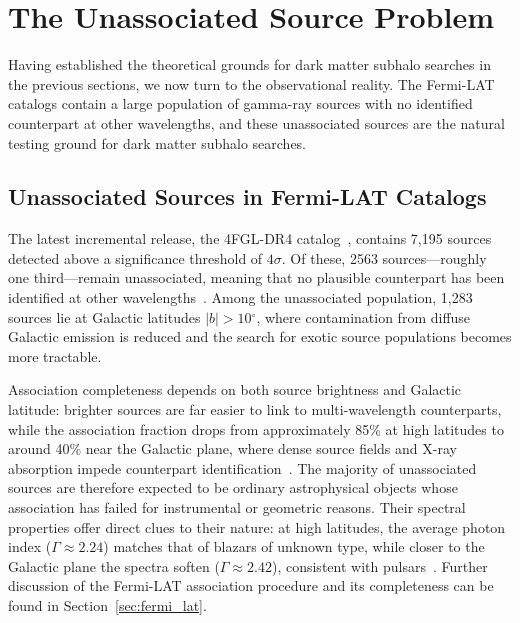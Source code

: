 
\section{The Unassociated Source Problem}
\label{sec:5.4}

Having established the theoretical grounds for dark matter subhalo searches in the previous sections, we now turn to the observational reality.
The Fermi-LAT catalogs contain a large population of gamma-ray sources with no identified counterpart at other wavelengths, and these unassociated sources are the natural testing ground for dark matter subhalo searches.

\subsection{Unassociated Sources in Fermi-LAT Catalogs}
\label{sec:5.4.1}

The latest incremental release, the 4FGL-DR4 catalog~\cite{Fermi-LAT:2022byn,Ballet:2023qzs}, contains 7,195 sources detected above a significance threshold of $4\sigma$.
Of these, 2563 sources---roughly one third---remain unassociated, meaning that no plausible counterpart has been identified at other wavelengths~\cite{Ballet:2023qzs}.
Among the unassociated population, 1,283 sources lie at Galactic latitudes $|b| > 10{{}^\circ}$, where contamination from diffuse Galactic emission is reduced and the search for exotic source populations becomes more tractable.

Association completeness depends on both source brightness and Galactic latitude: brighter sources are far easier to link to multi-wavelength counterparts, while the association fraction drops from approximately 85\% at high latitudes to around 40\% near the Galactic plane, where dense source fields and X-ray absorption impede counterpart identification~\cite{Fermi-LAT:2019yla}.
The majority of unassociated sources are therefore expected to be ordinary astrophysical objects whose association has failed for instrumental or geometric reasons.
Their spectral properties offer direct clues to their nature: at high latitudes, the average photon index ($\Gamma \approx 2.24$) matches that of blazars of unknown type, while closer to the Galactic plane the spectra soften ($\Gamma \approx 2.42$), consistent with pulsars~\cite{Fermi-LAT:2019yla}.
Further discussion of the Fermi-LAT association procedure and its completeness can be found in Section~\ref{sec:fermi_lat}.

